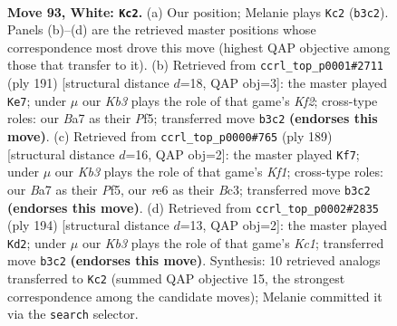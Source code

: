 \documentclass[11pt]{article}
\begin{document}
\clearpage

\begin{figure}[p]\centering
\begin{subfigure}{0.46\textwidth}\centering
\resizebox{\linewidth}{!}{%
\newchessgame
\chessboard[
  setfen={6k1/B7/4r3/1R6/4p3/1K3p1P/5P2/8 w - - 11 93},
  showmover=false,
  pgfstyle=straightmove, color=movearrow, markmove={b3-c2}
]}
\caption{}
\end{subfigure}\hfill
\begin{subfigure}{0.46\textwidth}\centering
\resizebox{\linewidth}{!}{%
\newchessgame
\chessboard[
  setfen={8/5k2/1R6/3p1p2/3P1P1K/4P3/8/r7 b - - 68 96},
  showmover=false,
  pgfstyle=straightmove, color=movearrow, markmove={f7-e7}
]}
\caption{}
\end{subfigure}
\\[4pt]
\begin{subfigure}{0.46\textwidth}\centering
\resizebox{\linewidth}{!}{%
\newchessgame
\chessboard[
  setfen={5k2/8/3R2p1/4ppP1/7P/2b5/5K2/8 b - - 2 95},
  showmover=false,
  pgfstyle=straightmove, color=movearrow, markmove={f8-f7}
]}
\caption{}
\end{subfigure}\hfill
\begin{subfigure}{0.46\textwidth}\centering
\resizebox{\linewidth}{!}{%
\newchessgame
\chessboard[
  setfen={8/8/8/p1k1r3/Pp6/1B4R1/8/2K5 w - - 9 98},
  showmover=false,
  pgfstyle=straightmove, color=movearrow, markmove={c1-d2}
]}
\caption{}
\end{subfigure}
\caption{\textbf{Move 93, White: \texttt{Kc2}.} (a) Our position; Melanie plays \texttt{Kc2} (\texttt{b3c2}). Panels (b)--(d) are the retrieved master positions whose correspondence most drove this move (highest QAP objective among those that transfer to it). (b) Retrieved from \texttt{ccrl\_top\_p0001\#2711} (ply 191) [structural distance $d$=18, QAP obj=3]: the master played \texttt{Ke7}; under $\mu$ our \emph{Kb3} plays the role of that game's \emph{Kf2}; cross-type roles: our \emph{B}a7 as their \emph{P}f5; transferred move \texttt{b3c2} \textbf{(endorses this move)}. (c) Retrieved from \texttt{ccrl\_top\_p0000\#765} (ply 189) [structural distance $d$=16, QAP obj=2]: the master played \texttt{Kf7}; under $\mu$ our \emph{Kb3} plays the role of that game's \emph{Kf1}; cross-type roles: our \emph{B}a7 as their \emph{P}f5, our \emph{r}e6 as their \emph{B}c3; transferred move \texttt{b3c2} \textbf{(endorses this move)}. (d) Retrieved from \texttt{ccrl\_top\_p0002\#2835} (ply 194) [structural distance $d$=13, QAP obj=2]: the master played \texttt{Kd2}; under $\mu$ our \emph{Kb3} plays the role of that game's \emph{Kc1}; transferred move \texttt{b3c2} \textbf{(endorses this move)}. Synthesis: 10 retrieved analogs transferred to \texttt{Kc2} (summed QAP objective 15, the strongest correspondence among the candidate moves); Melanie committed it via the \texttt{search} selector.}
\label{fig:thought-m184}
\end{figure}
\end{document}
